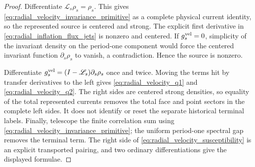 \documentclass[11pt]{amsart}
\theoremstyle{compactplain}
\theoremstyle{compactdefinition}
\theoremstyle{compactremark}
\newcommand{\Ltransfer}{\mathscr L}
\begin{document}
\begin{proof}
Differentiate \(\Ltransfer_s\rho_s=\rho_s\).  This gives
\eqref{eq:radial_velocity_invariance_primitive} as a complete
physical current identity, so the represented source is centered and strong.
The explicit first derivative in
\eqref{eq:radial_inflation_flux_jets} is nonzero and centered.  If
\(g_s^{\rm vel}=0\), simplicity of the invariant density on the period-one
component would force the centered invariant function
\(\partial_s\rho_s\) to vanish, a contradiction.  Hence the source is
nonzero.

Differentiate
\(g_s^{\rm vel}=(I-\Ltransfer_s)\partial_s\rho_s\) once and twice.  Moving the
terms hit by transfer derivatives to the left gives
\eqref{eq:radial_velocity_q1} and
\eqref{eq:radial_velocity_q2}.  The right sides are centered strong
densities, so equality of the total represented currents removes the total
face and point sectors in the complete left sides.  It does not identify or
reset the separate historical terminal labels.  Finally, telescope the
finite correlation sum using
\eqref{eq:radial_velocity_invariance_primitive}; the uniform
period-one spectral gap removes the terminal term.  The right side of
\eqref{eq:radial_velocity_susceptibility} is an explicit
transported pairing, and two ordinary differentiations give the displayed
formulae.
\end{proof}
\end{document}
